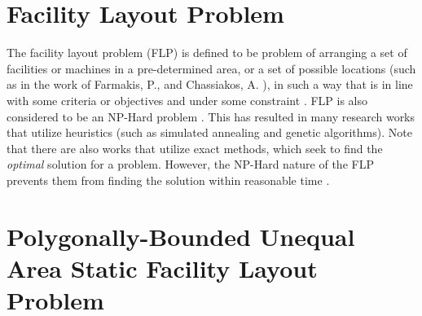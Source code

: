 \section{Facility Layout Problem}
The facility layout problem (FLP) is defined to be problem of arranging a set of facilities or machines in a pre-determined area, or a set of possible locations (such as in the work of Farmakis, P., and Chassiakos, A. \cite{Farmakis2018}), in such a way that is in line with some criteria or objectives and under some constraint \cite{Hosseini-Nasab2018}. FLP is also considered to be an NP-Hard problem \cite{Drira2007}. This has resulted in many research works that utilize heuristics (such as simulated annealing and genetic algorithms). Note that there are also works that utilize exact methods, which seek to find the \textit{optimal} solution for a problem. However, the NP-Hard nature of the FLP prevents them from finding the solution within reasonable time \cite{Asl2015}.

\section{Polygonally-Bounded Unequal Area Static Facility Layout Problem}
